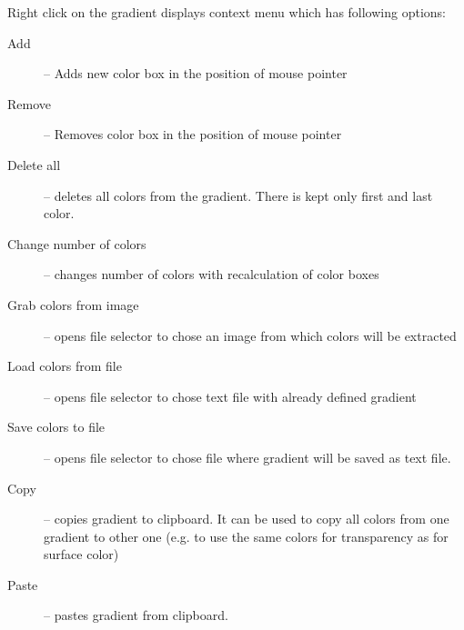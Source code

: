 Right click on the gradient displays context menu which has following options:
\nopagebreak
\begin{description}
	\item[Add] -- Adds new color box in the position of mouse pointer
	\item[Remove] -- Removes color box in the position of mouse pointer
	\item[Delete all] -- deletes all colors from the gradient. There is kept only first and last color.
	\item[Change number of colors] -- changes number of colors with recalculation of color boxes
	\item[Grab colors from image] -- opens file selector to chose an image from which colors will be extracted
	\item[Load colors from file] -- opens file selector to chose text file with already defined gradient
	\item[Save colors to file] -- opens file selector to chose file where gradient will be saved as text file.
	\item[Copy] -- copies gradient to clipboard. It can be used to copy all colors from one gradient to other one (e.g. to use the same colors for transparency as for surface color)
	\item[Paste] -- pastes gradient from clipboard. 
\end{description}

